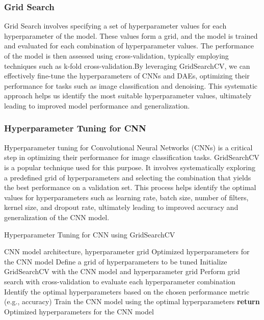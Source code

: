 \subsubsection{Grid Search}
Grid Search involves specifying a set of hyperparameter values for each hyperparameter of the model. These values form a grid, and the model is trained and evaluated for each combination of hyperparameter values. The performance of the model is then assessed using cross-validation, typically employing techniques such as k-fold cross-validation.By leveraging GridSearchCV, we can effectively fine-tune the hyperparameters of CNNs and DAEs, optimizing their performance for tasks such as image classification and denoising. This systematic approach helps us identify the most suitable hyperparameter values, ultimately leading to improved model performance and generalization.

\subsubsection{Hyperparameter Tuning for CNN}
Hyperparameter tuning for Convolutional Neural Networks (CNNs) is a critical step in optimizing their performance for image classification tasks. GridSearchCV is a popular technique used for this purpose. It involves systematically exploring a predefined grid of hyperparameters and selecting the combination that yields the best performance on a validation set. This process helps identify the optimal values for hyperparameters such as learning rate, batch size, number of filters, kernel size, and dropout rate, ultimately leading to improved accuracy and generalization of the CNN model.
 
\begin{algorithm}
    \caption{Hyperparameter Tuning for CNN using GridSearchCV}
    \begin{algorithmic}[1]
        \Require CNN model architecture, hyperparameter grid
        \Ensure Optimized hyperparameters for the CNN model
        \State Define a grid of hyperparameters to be tuned
        \State Initialize GridSearchCV with the CNN model and hyperparameter grid
        \State Perform grid search with cross-validation to evaluate each hyperparameter combination
        \State Identify the optimal hyperparameters based on the chosen performance metric (e.g., accuracy)
        \State Train the CNN model using the optimal hyperparameters
        \State \textbf{return} Optimized hyperparameters for the CNN model
    \end{algorithmic}
\end{algorithm}

